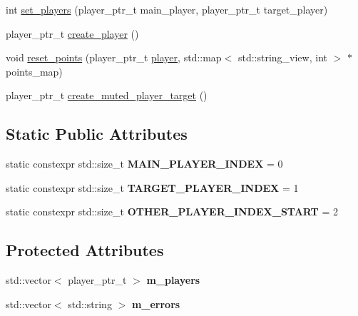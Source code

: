 \begin{DoxyCompactItemize}
\item 
int \hyperlink{structmods_1_1player__scaffolding_a784d255d6d870ef95e00fdcaa8760824}{set\+\_\+players} (player\+\_\+ptr\+\_\+t main\+\_\+player, player\+\_\+ptr\+\_\+t target\+\_\+player)
\item 
player\+\_\+ptr\+\_\+t \hyperlink{structmods_1_1player__scaffolding_a668b8803bcad438e141ae1811fc08353}{create\+\_\+player} ()
\item 
void \hyperlink{structmods_1_1player__scaffolding_ab83785facbe8d207e1bb5e8b8e2b0308}{reset\+\_\+points} (player\+\_\+ptr\+\_\+t \hyperlink{classmods_1_1player}{player}, std\+::map$<$ std\+::string\+\_\+view, int $>$ $\ast$points\+\_\+map)
\item 
player\+\_\+ptr\+\_\+t \hyperlink{structmods_1_1player__scaffolding_a230c174a6d647b84fc8ed63e544fdab1}{create\+\_\+muted\+\_\+player\+\_\+target} ()
\end{DoxyCompactItemize}
\subsection*{Static Public Attributes}
\begin{DoxyCompactItemize}
\item 
\mbox{\label{structmods_1_1player__scaffolding_ac3344da832203b3f9ec3e88f143486fd}} 
static constexpr std\+::size\+\_\+t {\bfseries M\+A\+I\+N\+\_\+\+P\+L\+A\+Y\+E\+R\+\_\+\+I\+N\+D\+EX} = 0
\item 
\mbox{\label{structmods_1_1player__scaffolding_abc44ded823c15d0e919f012a7c8682f0}} 
static constexpr std\+::size\+\_\+t {\bfseries T\+A\+R\+G\+E\+T\+\_\+\+P\+L\+A\+Y\+E\+R\+\_\+\+I\+N\+D\+EX} = 1
\item 
\mbox{\label{structmods_1_1player__scaffolding_a867549d5bdd2b72915b2035c68fc4fbd}} 
static constexpr std\+::size\+\_\+t {\bfseries O\+T\+H\+E\+R\+\_\+\+P\+L\+A\+Y\+E\+R\+\_\+\+I\+N\+D\+E\+X\+\_\+\+S\+T\+A\+RT} = 2
\end{DoxyCompactItemize}
\subsection*{Protected Attributes}
\begin{DoxyCompactItemize}
\item 
\mbox{\label{structmods_1_1player__scaffolding_a68424701ce6140e9919018f64235202f}} 
std\+::vector$<$ player\+\_\+ptr\+\_\+t $>$ {\bfseries m\+\_\+players}
\item 
\mbox{\label{structmods_1_1player__scaffolding_a156411443790860d9b7aa407c4a8b591}} 
std\+::vector$<$ std\+::string $>$ {\bfseries m\+\_\+errors}
\end{DoxyCompactItemize}


